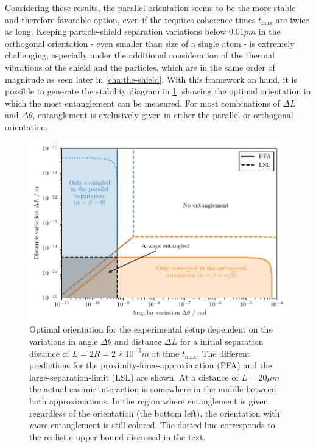 Considering these results, the parallel orientation seems to be the more stable and therefore favorable option, even if the requires coherence times $t_\mathrm{max}$ are twice as long.
Keeping particle-shield separation variations below $0.01\si{pm}$ in the orthogonal orientation - even smaller than size of a single atom - is extremely challenging,  
especially under the additional consideration of the thermal vibrations of the shield and the particles, which are in the same order of magnitude as seen later in \cref{cha:the-shield}.
With this framework on hand, it is possible to generate the stability diagram in \cref{fig:4:optimal-orientation}, showing the optimal orientation in which the most entanglement can be measured.
For most combinations of $\Delta L$ and $\Delta \theta$, entanglement is exclusively given in either the parallel or orthogonal orientation.
\begin{figure}[!htbp]
  \centering
  \includegraphics[width=\textwidth]{./../figures/optimize/optimized-orientation-advanced.pdf}
  \caption{Optimal orientation for the experimental setup dependent on the variations in angle $\Delta\theta$ and distance $\Delta L$ for a initial separation distance of $L=2R=2\times 10^{-5}\si{m}$ at time $t_\mathrm{max}$. The different predictions for the proximity-force-approximation (PFA) and the large-separation-limit (LSL) are shown. At a distance of $L=20\si{\mu m}$ the actual casimir interaction is somewhere in the middle between both approximations. In the region where entanglement is given regardless of the orientation (the bottom left), the orientation with \textit{more} entanglement is still colored. The dotted line corresponds to the realistic upper bound discussed in the text.}
  \label{fig:4:optimal-orientation}
\end{figure}


